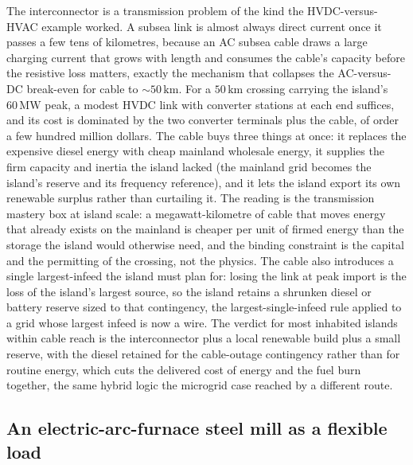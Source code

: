 The interconnector is a transmission problem of the kind the HVDC-versus-HVAC
example worked. A subsea link is almost always direct current once it passes a
few tens of kilometres, because an AC subsea cable draws a large charging
current that grows with length and consumes the cable's capacity before the
resistive loss matters, exactly the mechanism that collapses the AC-versus-DC
break-even for cable to $\sim 50\,\si{\kilo\meter}$. For a $50\,\si{\kilo
\meter}$ crossing carrying the island's $60\,\si{\mega\watt}$ peak, a modest
HVDC link with converter stations at each end suffices, and its cost is
dominated by the two converter terminals plus the cable, of order a few
hundred million dollars. The cable buys three things at once: it replaces the
expensive diesel energy with cheap mainland wholesale energy, it supplies the
firm capacity and inertia the island lacked (the mainland grid becomes the
island's reserve and its frequency reference), and it lets the island export
its own renewable surplus rather than curtailing it. The reading is the
transmission mastery box at island scale: a megawatt-kilometre of cable that
moves energy that already exists on the mainland is cheaper per unit of firmed
energy than the storage the island would otherwise need, and the binding
constraint is the capital and the permitting of the crossing, not the physics.
The cable also introduces a single largest-infeed the island must plan for:
losing the link at peak import is the loss of the island's largest source, so
the island retains a shrunken diesel or battery reserve sized to that
contingency, the largest-single-infeed rule applied to a grid whose largest
infeed is now a wire. The verdict for most inhabited islands within cable
reach is the interconnector plus a local renewable build plus a small reserve,
with the diesel retained for the cable-outage contingency rather than for
routine energy, which cuts the delivered cost of energy and the fuel burn
together, the same hybrid logic the microgrid case reached by a different
route.

\subsection{An electric-arc-furnace steel mill as a flexible load}

